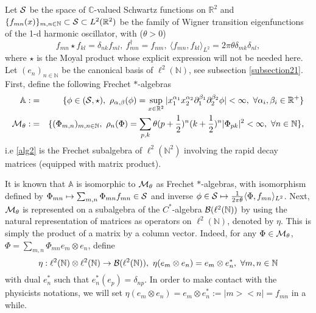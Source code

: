 \documentclass[a4paper,11pt,twoside]{article}
\numberwithin{equation}{section}
\theoremstyle{nonumberplain}
\newcounter{and}
\begin{document}
Let ${\cal{S}}$ be the space of $\mathbb{C}$-valued Schwartz functions on $\mathbb{R}^2$ and $\{f_{mn}(x) \}_{m,n\in\mathbb{N}}\subset{\cal{S}}\subset L^2(\mathbb{R}^2)$ be the family of Wigner transition eigenfunctions of the 1-d harmonic oscillator, with ($\theta>0$)
\begin{equation}
f_{mn}\star f_{kl}=\delta_{nk}f_{ml},\ f_{mn}^\dag=f_{nm},\ \langle f_{mn},f_{kl} \rangle_{L^2}=2\pi\theta\delta_{mk}\delta_{nl}\label{matrix-base-basic},
\end{equation}
where $\star$ is the Moyal product whose explicit expression will not be needed here. Let $(e_n)_{n\in\mathbb{N}}$ be the canonical basis of $\ell^2(\mathbb{N})$, see subsection \ref{subsection21}. First, define the following Frechet $*$-algebras
\begin{eqnarray}
{\mathbb{A}}:&=&\{\phi\in({\cal{S}},\star),\ \rho_{\alpha,\beta}(\phi)=\sup_{x\in\mathbb{R}^2}|x_1^{\alpha_1}x_2^{\alpha_2}\partial_1^{\beta_1}\partial_2^{\beta_2}\phi|<\infty,\ \forall \alpha_i,\beta_i\in\mathbb{R}^+ \}\label{alg1}\\
{\cal{M}}_\theta:&=&\{(\Phi_{m,n})_{m,n\in\mathbb{N}},\ \rho_n(\Phi)=\sum_{p,k}\theta(p+\frac{1}{2})^n(k+\frac{1}{2})^n|\Phi_{pk}|^2<\infty,\ \forall n\in\mathbb{N}\}\label{alg2},
\end{eqnarray}
i.e \eqref{alg2} is the Frechet subalgebra of $\ell^2(\mathbb{N}^2)$ involving the rapid decay matrices (equipped with matrix product).\par
It is known that ${\mathbb{A}}$ is isomorphic to ${\cal{M}}_\theta$ as Frechet $*$-algebras, with isomorphism defined by $\Phi_{mn}\mapsto \sum_{m,n}\Phi_{mn}f_{mn}\in{\cal{S}}$ and inverse $\phi\in{\cal{S}}\mapsto\frac{1}{2\pi\theta}\langle \Phi,f_{mn}\rangle_{L^2}$. Next, ${\cal{M}}_\theta$ is represented on a subalgebra of the $C^*$-algebra  ${\cal{B}}(\ell^2(\mathbb{N}))$ by using the natural representation of matrices as operators on $\ell^2(\mathbb{N})$, denoted by $\eta$. This is simply the product of a matrix by a column vector. Indeed, for any $\Phi\in{\cal{M}}_\theta$, $\Phi=\sum_{m,n}\Phi_{mn}e_m\otimes e_n$, define
\begin{equation}
\eta:\ell^2(\mathbb{N})\otimes\ell^2(\mathbb{N})\to{\cal{B}}(\ell^2(\mathbb{N})),\ \eta(e_m\otimes e_n)=e_m\otimes e^*_n,\ \forall m,n\in\mathbb{N}\nonumber
\end{equation}
with dual $e^*_n$ such that $e^*_n(e_p)=\delta_{np}$. In order to make contact with the physicists notations, we will set $\eta(e_m\otimes e_n)=e_m\otimes e^*_n:=|m><n|=f_{mn}$ in a while. \par
\end{document}
